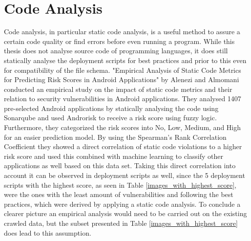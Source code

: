 \section{Code Analysis}
\label{sec:codeAnalysis}
Code analysis, in particular static code analysis, is a useful method to assure a certain code quality or find errors before even running a program. While this thesis does not analyse source code of programming languages, it does still statically analyse the deployment scripts for best practices and prior to this even for compatibility of the file schema.
"Empirical Analysis of Static Code Metrics for Predicting Risk Scores in Android Applications" \cite{androidAlenezi} by Alenezi and Almomani conducted an empirical study on the impact of static code metrics and their relation to security vulnerabilities in Android applications. They analysed 1407 pre-selected Android applications by statically analysing the code using Sonarqube and used Androrisk to receive a risk score using fuzzy logic. Furthermore, they categorized the risk scores into No, Low, Medium, and High for an easier prediction model. By using the Spearman's Rank Correlation Coefficient they showed a direct correlation of static code violations to a higher risk score and used this combined with machine learning to classify other applications as well based on this data set. Taking this direct correlation into account it can be observed in deployment scripts as well, since the 5 deployment scripts with the highest score, as seen in Table \ref{images_with_highest_score}, were the ones with the least amount of vulnerabilities and following the best practices, which were derived by applying a static code analysis. To conclude a clearer picture an empirical analysis would need to be carried out on the existing crawled data, but the subset presented in Table \ref{images_with_highest_score} does lead to this assumption.

